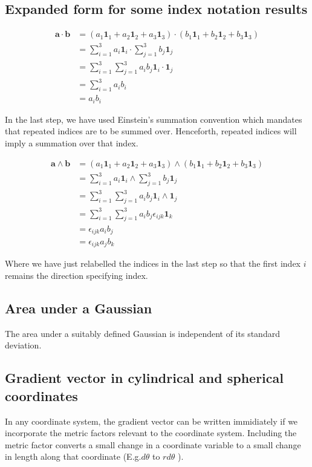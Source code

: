 \documentclass[11pt, letterpaper]{article}
\newcommand{\e}{\epsilon}
\newcommand{\1}{\bm{1}}
\begin{document}
\subsection{Expanded form for some index notation results}
\begin{align*}
\bm{a} \cdot \bm{b} &= (a_1\1_1+a_2\1_2+a_3\1_3)\cdot(b_1\1_1+b_2\1_2+b_3\1_3)\\
&= \sum_{i=1}^{3} a_i \1_i \cdot \sum_{j=1}^{3} b_j \1_j\\
&= \sum_{i=1}^{3} \sum_{j=1}^{3} a_i b_j \1_i \cdot \1_j\\
&= \sum_{i=1}^{3} a_i b_i\\
&= a_i b_i  
\end{align*}

In the last step, we have used Einstein's summation convention which mandates that repeated indices are to be summed over. Henceforth, repeated indices will imply a summation over that index.

\begin{align*}
\bm{a} \wedge \bm{b} &= (a_1\1_1+a_2\1_2+a_3\1_3)\wedge(b_1\1_1+b_2\1_2+b_3\1_3)\\
&=\sum_{i=1}^{3} a_i \1_i \wedge \sum_{j=1}^{3} b_j \1_j\\
&=\sum_{i=1}^{3}  \sum_{j=1}^{3} a_i b_j \1_i \wedge  \1_j\\
&=\sum_{i=1}^{3}  \sum_{j=1}^{3} a_i b_j \e_{ijk}\1_k\\
&=\e_{ijk}a_ib_j\\
&=\e_{ijk}a_jb_k
\end{align*}

Where we have just relabelled the indices in the last step so that the first index $i$ remains the direction specifying index. 


\subsection{Area under a Gaussian}
The area under a suitably defined Gaussian is independent of its standard deviation. 

\subsection{Gradient vector in cylindrical and spherical coordinates}
In any coordinate system, the gradient vector can be written immidiately if we incorporate the metric factors relevant to the coordinate system. Including the metric factor converts a small change in a coordinate variable to a small change in length along that coordinate (E.g.$d\theta$ to $rd\theta$ ).
\end{document}
